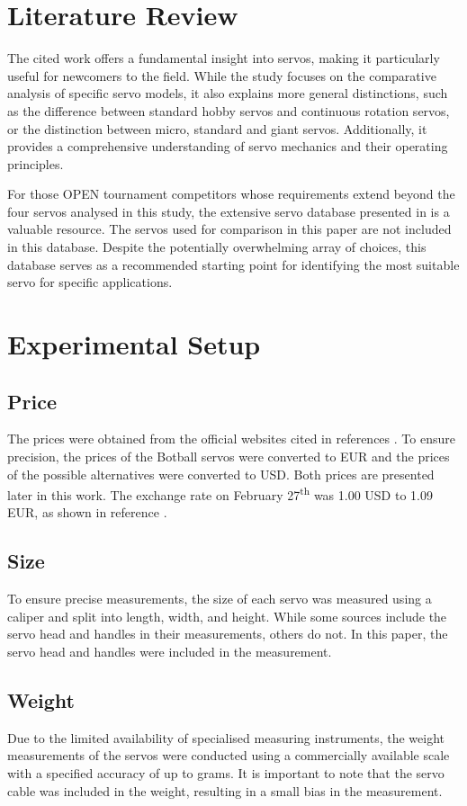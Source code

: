 \documentclass[conference]{IEEEtran}
\begin{document}
\section {Literature Review}
    The cited work \cite{b1} offers a fundamental insight into servos, making it particularly useful for newcomers to the field. While the study focuses on the comparative analysis of specific servo models, it also explains more general distinctions, such as the difference between standard hobby servos and continuous rotation servos, or the distinction between micro, standard and giant servos. Additionally, it provides a comprehensive understanding of servo mechanics and their operating principles.

    For those OPEN tournament competitors whose requirements extend beyond the four servos analysed in this study, the extensive servo database presented in \cite{b2} is a valuable resource. The servos used for comparison in this paper are not included in this database. Despite the potentially overwhelming array of choices, this database serves as a recommended starting point for identifying the most suitable servo for specific applications.
    
\section {Experimental Setup}
    \subsection{Price}
        The prices were obtained from the official websites cited in references \cite{b3, b4, b5, b6}. To ensure precision, the prices of the Botball servos were converted to EUR and the prices of the possible alternatives were converted to USD. Both prices are presented later in this work. The exchange rate on February 27\textsuperscript{th} was 1.00 USD to 1.09 EUR, as shown in reference \cite{b7}.

    \subsection{Size}
        To ensure precise measurements, the size of each servo was measured using a caliper and split into length, width, and height. While some sources include the servo head and handles in their measurements, others do not. In this paper, the servo head and handles were included in the measurement.
        
    \subsection{Weight}
        Due to the limited availability of specialised measuring instruments, the weight measurements of the servos were conducted using a commercially available scale with a specified accuracy of up to grams. It is important to note that the servo cable was included in the weight, resulting in a small bias in the measurement.
        
\end{document}
